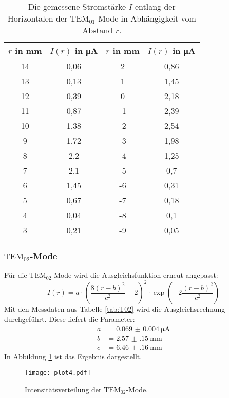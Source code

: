 \begin{table}
 \centering
 \caption{Die gemessene Stromstärke $I$ entlang der Horizontalen der $\text{TEM}_{\text{01}}$-Mode in Abhängigkeit vom Abstand $r$.}
 \label{tab:T01}
 \begin{tabular}{c c c c}
   \toprule
   $r$ in mm & $I(r)$ in \si{\micro\ampere} & $r$ in mm & $I(r)$ in \si{\micro\ampere} \\
   \midrule
   14 & 0,06 & 2  & 0,86 \\
   13 & 0,13 & 1  & 1,45 \\
   12 & 0,39 & 0  & 2,18 \\
   11 & 0,87 & -1 & 2,39 \\
   10 & 1,38 & -2 & 2,54 \\
   9  & 1,72 & -3 & 1,98 \\
   8  & 2,2  & -4 & 1,25 \\
   7  & 2,1  & -5 & 0,7  \\
   6  & 1,45 & -6 & 0,31 \\
   5  & 0,67 & -7 & 0,18 \\
   4  & 0,04 & -8 & 0,1  \\
   3  & 0,21 & -9 & 0,05 \\
   \bottomrule
 \end{tabular}
\end{table}

\subsubsection{$\text{TEM}_{02}$-Mode}

Für die $\text{TEM}_{02}$-Mode wird die Ausgleichsfunktion erneut angepasst:
\begin{equation}
  I(r) = a \cdot \left(\frac{8(r-b)^2}{c^2}-2\right)^2 \cdot \exp\left(-2\frac{(r-b)^2}{c^2}\right)
\end{equation}
Mit den Messdaten aus Tabelle \ref{tab:T02} wird die Ausgleichsrechnung durchgeführt.
Diese liefert die Parameter:
\begin{align*}
a &= \SI{0.069(4)}{\micro\ampere}\\
b &= \SI{2.57(15)}{\milli\metre}\\
c &= \SI{6.46(16)}{\milli\metre}
\end{align*}
In Abbildung \ref{fig:T02} ist das Ergebnis dargestellt.

\begin{figure}
  \centering
  \texttt{[image: plot4.pdf]}
  \caption{Intensitätsverteilung der $\text{TEM}_{02}$-Mode.}
  \label{fig:T02}
\end{figure}

